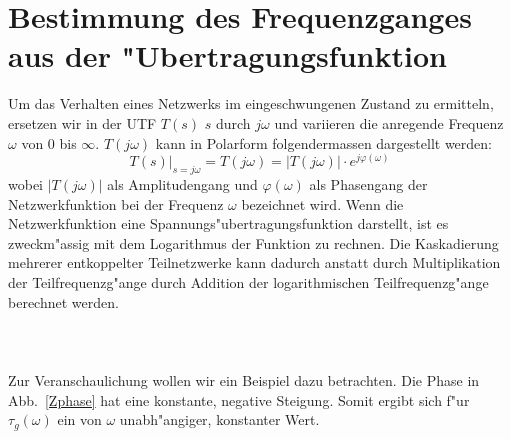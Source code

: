 \section{Bestimmung des Frequenzganges aus der "Ubertra\-gungs\-funk\-tion}
Um das Verhalten eines Netzwerks im eingeschwungenen Zustand zu
ermitteln, ersetzen wir in der UTF $T(s)$ $s$ durch $j\omega$ und
variieren die anregende
Frequenz $\omega$ von $0$ bis $\infty$. {\bf{}}  $T(j\omega)$ kann in
Polarform folgendermassen dargestellt werden:
\begin{equation}
\left. T(s)\right|_{s=j\omega}=T(j\omega)=|T(j\omega)|\cdot e^{j\varphi(\omega)}
\end{equation}
wobei $|T(j\omega)|$ als Amplitudengang und
$\varphi(\omega)$ als Phasengang der
Netzwerkfunktion bei der Frequenz $\omega$
bezeichnet wird.  Wenn die Netzwerkfunktion eine
Spannungs\-"ubertragungs\-funktion darstellt, ist es zweckm"assig mit dem
Logarithmus der Funktion zu rechnen. Die
Kaskadierung mehrerer entkoppelter Teilnetzwerke
kann dadurch anstatt durch Multiplikation der
Teilfrequenzg"ange durch Addition der
logarithmischen Teilfrequenzg"ange berechnet werden. {\bf{}}\\~~\\
\\~~\\ \nit Zur Veranschaulichung wollen wir ein Beispiel dazu betrachten. Die
Phase in Abb.~\ref{Zphase} hat eine konstante, negative Steigung.
Somit ergibt sich f"ur $\tau_{g}(\omega)$ ein von $\omega$
unabh"angiger, konstanter Wert.


